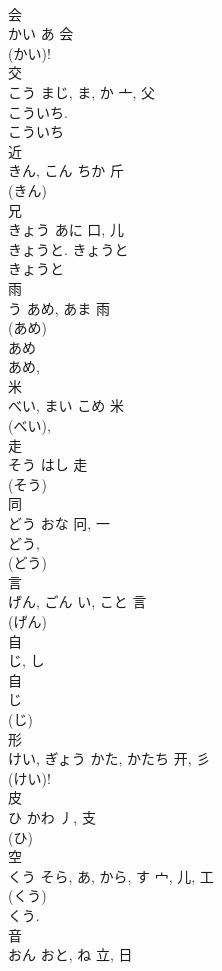 \documentclass[8pt]{extreport}
\begin{document}
\begin{CJK}{UTF8}{min}
\\	会	
\\	かい	あ	会	
\\	(かい)! 
\\	交	
\\	こう	まじ, ま, か	亠, 父	
\\	こういち. 
\\	こういち 
\\	近	
\\	きん, こん	ちか	斤		
\\	(きん) 
\\	兄	
\\	きょう	あに	口, 儿	
\\	きょうと. きょうと 
\\	きょうと 
\\	雨	
\\	う	あめ, あま	雨	
\\	(あめ) 
\\	あめ 
\\	あめ, 
\\	米	
\\	べい, まい	こめ	米	
\\	(べい), 
\\	走	
\\	そう	はし	走	
\\	(そう) 
\\	同	
\\	どう	おな	冋, 一	
\\	どう, 
\\	(どう) 
\\	言	
\\	げん, ごん	い, こと	言	
\\	(げん) 
\\	自	
\\	じ, し	
\\	自	
\\	じ 
\\	(じ) 
\\	形	
\\	けい, ぎょう	かた, かたち	开, 彡	
\\	(けい)! 
\\	皮	
\\	ひ	かわ	丿, 支	
\\	(ひ) 
\\	空	
\\	くう	そら, あ, から, す	宀, 儿, 工	
\\	(くう) 
\\	くう.
\\	音	
\\	おん	おと, ね	立, 日	

\end{CJK}
\end{document}
